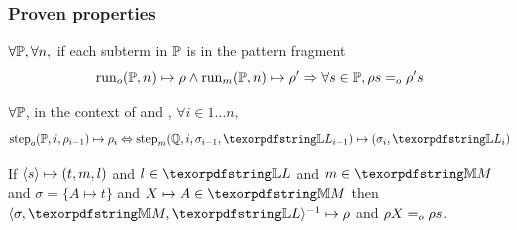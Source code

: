 \documentclass{pres}
\newtheorem{proposition}[theorem]{Proposition}
\newcommand{\sepFrame}[1]{
  \section{#1}
  \begin{frame}
    \centering
    {\usebeamerfont*{frametitle}\usebeamercolor[fg]{frametitle} #1}
  \end{frame}
}
\begin{document}
\begin{frame}
  \frametitle{Proven properties}

  \begin{description}[]
    \item[Run Equivalence]
    $\forall \mathbb{P}, \forall n,$ if each subterm in $\mathbb{P}$ is in the pattern fragment
    $$
      {\mathrm{run}}_o(\mathbb{P},n) \mapsto \rho \land
      {\mathrm{run}}_m(\mathbb{P},n) \mapsto \rho'
      \Rightarrow
      \forall s \in \mathbb{P}, \rho s =_o \rho' s
    $$
    \item [Simulation fidelity]
    $\forall \mathbb{P}$, in the context of  \frun and \hrun,
    $\forall i \in 1 \ldots n,$
    $$\stepF{\foUnifPb}{i}{\rho_{i-1}}{\rho_i}
    \Leftrightarrow
    \stepH{\hoUnifPb}{i}{\sigma_{i-1}}{\linkStore_{i-1}}{\sigma_i}{\linkStore_i}
    $$
    \item[Compilation round trip]
      If $\langle s \rangle\mapsto(t,m,l)$ and $l \in \linkStore$ and $m \in \mapStore$
      and
      $\sigma = \{ A \mapsto t\}$ and $\mapping{X}{A}{n} \in \mapStore$
      then\\
      \centering $\D{\sigma}{\mapStore}{\linkStore}{\rho}$ and
      $\rho X =_o \rho s$.
  \end{description}

\end{frame}

\end{document}
